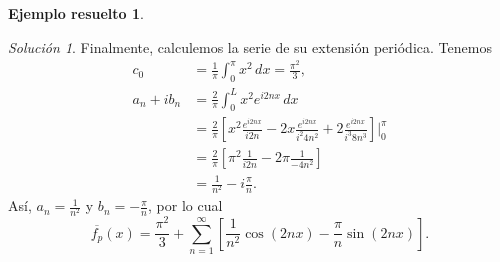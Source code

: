 \documentclass[11pt,letterpaper,draft]{report}
\theoremstyle{plain}
\theoremstyle{definition}
\newtheorem{solved}[theorem]{Ejemplo resuelto}
\theoremstyle{remark}
\newtheorem*{solution}{Solución}
\newcommand\<{\langle}
\renewcommand\>{\rangle}
\begin{document}
\begin{solved}
\begin{solution}
    Finalmente, calculemos la serie de su extensión periódica.
    Tenemos
    \begin{align*}
      c_0
      &= \frac{1}{\pi}\int_{0}^{\pi}x^{2}\,dx = \frac{\pi^{2}}{3}, \\
      a_n+ib_n
      &= \frac{2}{\pi}\int_{0}^{L}x^{2}e^{i 2nx}\,dx \\
      &= \frac{2}{\pi} \left[
        x^{2}\frac{e^{i 2nx}}{i 2n}
        -2x\frac{e^{i 2nx}}{i^{2}4n^{2}}
        +2 \frac{e^{i 2nx}}{i^{3} 8n^{3}}
      \right]\Big|_{0}^{\pi} \\
     &= \frac{2}{\pi} \left[
       \pi^{2}\frac{1}{i 2n}
       -2\pi \frac{1}{-4n^{2}}
     \right] \\
     &= \frac{1}{n^{2}}-i \frac{\pi}{n}.
    \end{align*}
    Así, $a_n=\frac{1}{n^{2}}$ y $b_n=-\frac{\pi}{n}$, por lo cual
    \[
      \overline{f_p}(x)
      =
      \frac{\pi^{2}}{3}
      +
      \sum_{n=1}^{\infty} \left[
        \frac{1}{n^{2}}\cos(2nx)
        -
        \frac{\pi}{n}\sin(2nx)
      \right]
    .\]
  \end{solution}
\end{solved}
\end{document}
